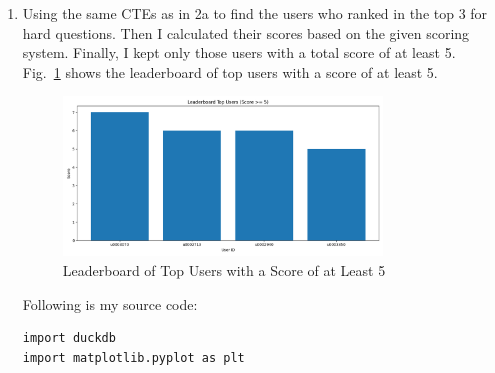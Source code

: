 \documentclass[12pt,a4paper]{article}
\begin{document}
\begin{enumerate}
\begin{enumerate}
\begin{verbatim}
con = duckdb.connect('my_database.db')

df = con.sql("""
-- list the hard questions
with hard_questions as(
    select question_id as id, count(*) as total_ans, sum(is_correct) as total_ac
    from answers
    group by question_id
    having total_ans >= 1000 and total_ac <= 500
),-- list the rank for all users
first_correct_pre as(
    select question_id, user_id, cost_time, created_at, rank() over(partition by question_id, user_id order by created_at asc) as rnk
    from answers
    where is_correct = 1
),-- first correct for each user
first_correct as(
    select question_id, user_id, cost_time, created_at
    from first_correct_pre
    where rnk = 1
),--rank users for hard questions
usr_rnk as(
    select question_id, user_id, rank() over(partition by question_id order by cost_time asc, created_at asc) as rnk
    from first_correct fc
    join hard_questions hq on hq.id = fc.question_id
)
select user_id, count(distinct question_id) as appr_cnt
from usr_rnk
where rnk <= 3
group by user_id
having appr_cnt >= 2
order by appr_cnt desc, user_id asc;
""").df()
print(df)

plt.figure(figsize=(12,6))
plt.bar(df["user_id"].astype(str), df["appr_cnt"])
plt.xlabel("User ID")
plt.ylabel("Number of Ranked Hard Questions")
plt.title("Leaderboard Top Users (Appearing in >= 2 Hard Questions)")
plt.tight_layout()
plt.savefig("2a_leaderboard.png")
plt.show()            
        \end{verbatim}
        \item Using the same CTEs as in 2a to find the users who ranked in the top 3 for hard questions. Then I calculated their scores based on the given scoring system. Finally, I kept only those users with a total score of at least 5.\\
        Fig.~\ref{fig:2b} shows the leaderboard of top users with a score of at least 5.
        \begin{figure}[H]
            \centering
            \includegraphics[width=0.8\textwidth]{code/2b_leaderboard.png}
            \caption{Leaderboard of Top Users with a Score of at Least 5}
            \label{fig:2b}
        \end{figure}
        Following is my source code:
        \begin{verbatim}
import duckdb
import matplotlib.pyplot as plt


\end{verbatim}
\end{enumerate}
\end{enumerate}
\end{document}
